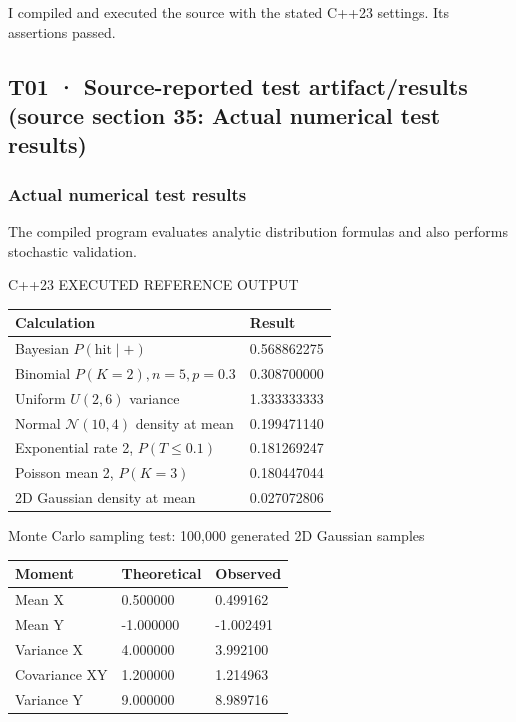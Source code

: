 I compiled and executed the source with the stated C++23 settings. Its assertions passed.

\subsection{T01 · Source-reported test artifact/results (source section 35: Actual numerical test results)}\label{02-foundations-ii-ch039-t01-source-reported-test-artifactresults-source-section-35-actual-numerical-test-results}

\subsubsection{Actual numerical test results}\label{02-foundations-ii-ch039-actual-numerical-test-results}

The compiled program evaluates analytic distribution formulas and also performs stochastic validation.

C++23 EXECUTED REFERENCE OUTPUT

{\def\LTcaptype{none} %
\begin{longtable}[]{@{}ll@{}}
\toprule\noalign{}
Calculation & Result \\
\midrule\noalign{}
\endhead
\bottomrule\noalign{}
\endlastfoot
Bayesian \(P(\text{hit}\mid+)\) & 0.568862275 \\
Binomial \(P(K=2), n=5,p=0.3\) & 0.308700000 \\
Uniform \(U(2,6)\) variance & 1.333333333 \\
Normal \(\mathcal N(10,4)\) density at mean & 0.199471140 \\
Exponential rate 2, \(P(T\le0.1)\) & 0.181269247 \\
Poisson mean 2, \(P(K=3)\) & 0.180447044 \\
2D Gaussian density at mean & 0.027072806 \\
\end{longtable}
}

Monte Carlo sampling test: 100,000 generated 2D Gaussian samples

{\def\LTcaptype{none} %
\begin{longtable}[]{@{}lll@{}}
\toprule\noalign{}
Moment & Theoretical & Observed \\
\midrule\noalign{}
\endhead
\bottomrule\noalign{}
\endlastfoot
Mean X & 0.500000 & 0.499162 \\
Mean Y & -1.000000 & -1.002491 \\
Variance X & 4.000000 & 3.992100 \\
Covariance XY & 1.200000 & 1.214963 \\
Variance Y & 9.000000 & 8.989716 \\
\end{longtable}
}

